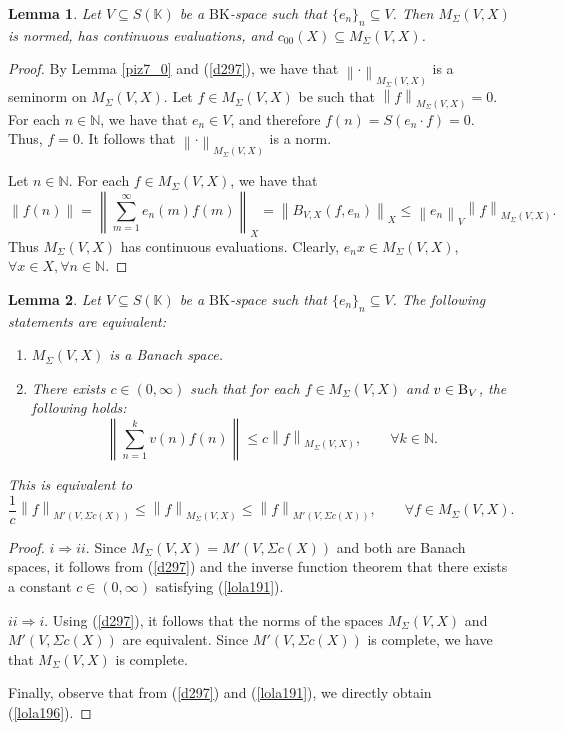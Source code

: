 \documentclass[14pt, a4paper]{article}  %
\providecommand{\norm}[1]{\left\lVert#1\right\rVert}
\newcommand{\K}{\mathbb{K}}
\newcommand{\N}{\mathbb{N}}
\newcommand{\BK}{\text{BK}}
\newcommand{\B}{\textup{B}}
\newcommand{\qs}{\setlength{\belowdisplayskip}{0pt}}
\newcommand{\Mt}{M'}
\newtheorem{lemma}{Lemma}[section]
\begin{document}
	\begin{lemma}\label{lola72}
		Let $V \subseteq S(\K)$ be a $\BK$-space such that $\{e_{n}\}_{n} \subseteq V$. Then $M_{\Sigma}(V,X)$ is normed, has continuous evaluations, and $c_{00}(X) \subseteq M_{\Sigma}(V,X)$. 
	\end{lemma}
	\begin{proof}
		By Lemma \ref{piz7_0} and (\ref{d297}), we have that $\norm{\cdot}_{M_{\Sigma}(V,X)}$ is a seminorm on $M_{\Sigma}(V,X)$. Let $f \in M_{\Sigma}(V,X)$ be such that $\norm{f}_{M_{\Sigma}(V,X)} = 0$. For each $n \in \N$, we have that $e_{n} \in V$, and therefore $f(n) = S(e_{n} \cdot f) = 0$. Thus, $f = 0$. It follows that $\norm{\cdot}_{M_{\Sigma}(V,X)}$ is a norm.
		
		Let $n \in \N$. For each $f \in M_{\Sigma}(V,X)$, we have that 
		\begin{equation}
			\norm{f(n)} = \norm{\sum_{m=1}^{\infty} e_{n}(m) f(m)}_{X} = \norm{B_{V,X}(f, e_{n})}_{X} \leq \norm{e_{n}}_{V} \norm{f}_{M_{\Sigma}(V,X)}.
		\end{equation}
		Thus $M_{\Sigma}(V,X)$ has continuous evaluations. Clearly, $e_{n}x \in M_{\Sigma}(V,X)$, $\forall x \in X, \forall n\in \N$. 
	\end{proof}
	
	\begin{lemma}\label{naty32}
		Let $V \subseteq S(\K)$ be a $\BK$-space such that $\{e_{n}\}_{n} \subseteq V$. The following statements are equivalent: \qs
		\begin{enumerate}
			\item[i.] $M_{\Sigma}(V,X)$ is a Banach space. 
			\item[ii.] There exists $c \in (0, \infty)$ such that for each $f \in M_{\Sigma}(V,X)$ and $v \in \B_{V}$, the following holds:
			\begin{equation}\label{lola191}
				\norm{\sum_{n=1}^{k} v(n) f(n)} \leq c \norm{f}_{M_{\Sigma}(V,X)}, \qquad \forall k \in \N.
			\end{equation} 
		\end{enumerate}
		This is equivalent to  
		\begin{equation}\label{lola196}
			\frac{1}{c} \norm{f}_{\Mt(V, \Sigma c(X))} \leq \norm{f}_{M_{\Sigma}(V,X)} \leq \norm{f}_{\Mt(V, \Sigma c(X))}, \qquad \forall f \in M_{\Sigma}(V,X).
		\end{equation} 
	\end{lemma}
	\begin{proof} 
		$i \Longrightarrow ii.$ Since $M_{\Sigma}(V,X) = \Mt(V, \Sigma c(X))$ and both are Banach spaces, it follows from (\ref{d297}) and the inverse function theorem that there exists a constant $c \in (0, \infty)$ satisfying (\ref{lola191}).
		
		$ii \Longrightarrow i.$ Using (\ref{d297}), it follows that the norms of the spaces $M_{\Sigma}(V,X)$ and $\Mt(V, \Sigma c(X))$ are equivalent. Since $\Mt(V, \Sigma c(X))$ is complete,  we have that $M_{\Sigma}(V,X)$ is complete.
		
		Finally, observe that from (\ref{d297}) and (\ref{lola191}), we directly obtain (\ref{lola196}). 	
	\end{proof}
\end{document}
